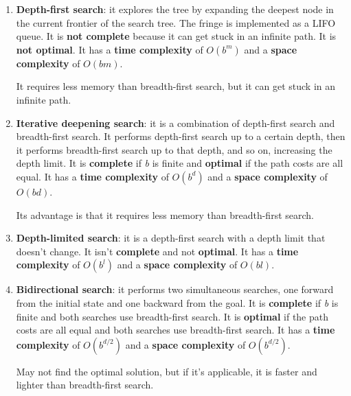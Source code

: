 \documentclass[12pt]{article}
\begin{document}
\begin{enumerate}[label=\textbf{US.\arabic*}]
\begin{enumerate}
              \item \textbf{Depth-first search}: it explores the tree by expanding the deepest node in the current frontier of the search tree.
                    The fringe is implemented as a LIFO queue.
                    It is \textbf{not complete} because it can get stuck in an infinite path.
                    It is \textbf{not optimal}.
                    It has a \textbf{time complexity} of $O(b^m)$ and a \textbf{space complexity} of $O(bm)$.

                    It requires less memory than breadth-first search, but it can get stuck in an infinite path.

              \item \textbf{Iterative deepening search}: it is a combination of depth-first search and breadth-first search.
                    It performs depth-first search up to a certain depth, then it performs breadth-first search up to that depth,
                    and so on, increasing the depth limit.
                    It is \textbf{complete} if \textit{b} is finite and \textbf{optimal} if the path costs are all equal.
                    It has a \textbf{time complexity} of $O(b^d)$ and a \textbf{space complexity} of $O(bd)$.

                    Its advantage is that it requires less memory than breadth-first search.

              \item \textbf{Depth-limited search}: it is a depth-first search with a depth limit that doesn't change.
                    It isn't \textbf{complete} and not \textbf{optimal}.
                    It has a \textbf{time complexity} of $O(b^l)$ and a \textbf{space complexity} of $O(bl)$.

              \item \textbf{Bidirectional search}: it performs two simultaneous searches, one forward from the initial state and one backward from the goal.
                    It is \textbf{complete} if \textit{b} is finite and both searches use breadth-first search.
                    It is \textbf{optimal} if the path costs are all equal and both searches use breadth-first search.
                    It has a \textbf{time complexity} of $O(b^{d/2})$ and a \textbf{space complexity} of $O(b^{d/2})$.

                    May not find the optimal solution, but if it's applicable, it is faster and lighter than breadth-first search.
          \end{enumerate}

\end{enumerate}
\end{document}
